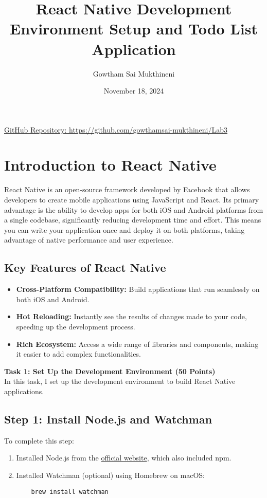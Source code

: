 \documentclass{article}
\title{React Native Development Environment Setup and Todo List Application}
\author{Gowtham Sai Mukthineni}
\date{November 18, 2024}
\begin{document}
\maketitle

\begin{center}
\href{https://github.com/gowthamsai-mukthineni/Lab3}{GitHub Repository: https://github.com/gowthamsai-mukthineni/Lab3}
\end{center}

\section{Introduction to React Native}
React Native is an open-source framework developed by Facebook that allows developers to create mobile applications using JavaScript and React. Its primary advantage is the ability to develop apps for both iOS and Android platforms from a single codebase, significantly reducing development time and effort. This means you can write your application once and deploy it on both platforms, taking advantage of native performance and user experience.

\subsection{Key Features of React Native}
\begin{itemize}
    \item \textbf{Cross-Platform Compatibility:} Build applications that run seamlessly on both iOS and Android.
    \item \textbf{Hot Reloading:} Instantly see the results of changes made to your code, speeding up the development process.
    \item \textbf{Rich Ecosystem:} Access a wide range of libraries and components, making it easier to add complex functionalities.
\end{itemize}


\noindent\textbf{\Large Task 1: Set Up the Development Environment (50 Points)}\\[0.5cm]
\noindent In this task, I set up the development environment to build React Native applications.\\[1cm]

\subsection{Step 1: Install Node.js and Watchman}
To complete this step:
\begin{enumerate}
    \item Installed Node.js from the \href{https://nodejs.org/en}{official website}, which also included npm.
    \item Installed Watchman (optional) using Homebrew on macOS:
    \begin{verbatim}
    brew install watchman
    \end{verbatim}
\end{enumerate}
\end{document}
